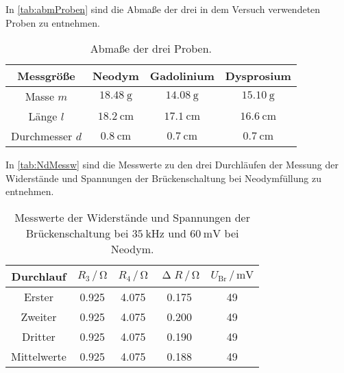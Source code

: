 In \autoref{tab:abmProben} sind die Abmaße der drei in dem Versuch verwendeten Proben zu entnehmen.
\begin{table}[H]
  \centering
  \caption{Abmaße der drei Proben.}
  \label{tab:abmProben}
  \begin{tabular}{c c c c}
    \toprule
    Messgröße & Neodym & Gadolinium & Dysprosium \\
    \midrule
    Masse $m$ & $\SI{18.48}{\gram}$ & $\SI{14.08}{\gram}$ & $\SI{15.10}{\gram}$ \\
    Länge $l$ & $\SI{18.2}{\centi\meter}$ & $\SI{17.1}{\centi\meter}$ & $\SI{16.6}{\centi\meter}$ \\ %
    Durchmesser $d$ & $\SI{0.8}{\centi\meter}$ & $\SI{0.7}{\centi\meter}$ & $\SI{0.7}{\centi\meter}$ \\
    \bottomrule
  \end{tabular}
\end{table}

In \autoref{tab:NdMessw} sind die Messwerte zu den drei Durchläufen der Messung der Widerstände und Spannungen der Brückenschaltung bei Neodymfüllung zu entnehmen.
\begin{table}[H]
  \centering
  \caption{Messwerte der Widerstände und Spannungen der Brückenschaltung bei $\SI{35}{\kilo\hertz}$ und $\SI{60}{\milli\volt}$ bei Neodym.}
  \label{tab:NdMessw}
  \begin{tabular}{c| c c c c}
    \toprule
    Durchlauf & $R_3 \,/\, \si{\ohm}$ & $R_4 \,/\, \si{\ohm}$ & $\upDelta R \,/\, \si{\ohm}$ & $U_{\text{Br}} \,/\, \si{\milli\volt}$ \\%
    \midrule
    Erster & 0.925 & 4.075 & 0.175 & 49 \\
    Zweiter & 0.925 & 4.075 & 0.200 & 49 \\
    Dritter & 0.925 & 4.075 & 0.190 & 49 \\
    Mittelwerte & 0.925 & 4.075 & 0.188 & 49\\
    \bottomrule
  \end{tabular}
\end{table}


